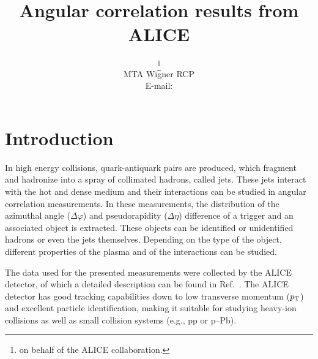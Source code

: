 \documentclass{PoS}
\title{Angular correlation results from ALICE}
\author{\speaker{Monika Varga-Kofarago}\thanks{on behalf of the ALICE collaboration.}\\
        MTA Wigner RCP\\
        E-mail: \email{varga-kofarago.monika@wigner.mta.hu}}
\begin{document}
\section{Introduction}
In high energy collisions, quark-antiquark pairs are produced, which fragment and hadronize into a spray of collimated hadrons, called jets. These jets interact with the hot and dense medium and their interactions can be studied in angular correlation measurements. In these measurements, the distribution of the azimuthal angle ($\Delta\varphi$) and pseudorapidity ($\Delta\eta$) difference of a trigger and an associated object is extracted. These objects can be identified or unidentified hadrons or even the jets themselves. Depending on the type of the object, different properties of the plasma and of the interactions can be studied. 

The data used for the presented measurements were collected by the ALICE detector, of which a detailed description can be found in Ref.~\cite{ALICE}. The ALICE detector has good tracking capabilities down to low transverse momentum ($p_{\rm T}$) and excellent particle identification, making it suitable for studying heavy-ion collisions as well as small collision systems (e.g., pp or p--Pb).
\end{document}
